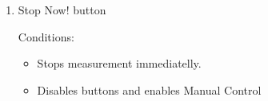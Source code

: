 \begin{enumerate}
\item Stop Now! button

Conditions:
\begin{itemize}
\item Stops measurement immediatelly.
\item Disables buttons and enables Manual Control
\end{itemize}

\end{enumerate}